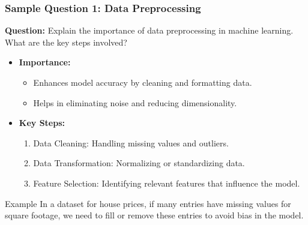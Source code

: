 \documentclass{beamer}
\begin{document}
\begin{frame}[fragile]
    \frametitle{Sample Question 1: Data Preprocessing}
    \textbf{Question:} Explain the importance of data preprocessing in machine learning. What are the key steps involved?

    \begin{itemize}
        \item \textbf{Importance:} 
        \begin{itemize}
            \item Enhances model accuracy by cleaning and formatting data.
            \item Helps in eliminating noise and reducing dimensionality.
        \end{itemize}
        
        \item \textbf{Key Steps:}
        \begin{enumerate}
            \item Data Cleaning: Handling missing values and outliers.
            \item Data Transformation: Normalizing or standardizing data.
            \item Feature Selection: Identifying relevant features that influence the model.
        \end{enumerate}
    \end{itemize}

    \begin{block}{Example}
        In a dataset for house prices, if many entries have missing values for square footage, we need to fill or remove these entries to avoid bias in the model.
    \end{block}
\end{frame}
\end{document}

